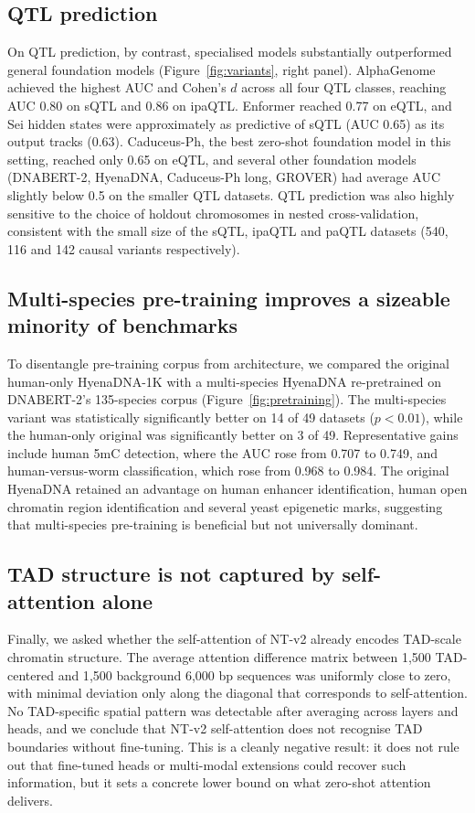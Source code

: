 \documentclass[11pt,a4paper]{article}
\begin{document}
\subsection{QTL prediction}
On QTL prediction, by contrast, specialised models substantially outperformed general foundation models (Figure~\ref{fig:variants}, right panel). AlphaGenome achieved the highest AUC and Cohen's $d$ across all four QTL classes, reaching AUC 0.80 on sQTL and 0.86 on ipaQTL. Enformer reached 0.77 on eQTL, and Sei hidden states were approximately as predictive of sQTL (AUC 0.65) as its output tracks (0.63). Caduceus-Ph, the best zero-shot foundation model in this setting, reached only 0.65 on eQTL, and several other foundation models (DNABERT-2, HyenaDNA, Caduceus-Ph long, GROVER) had average AUC slightly below 0.5 on the smaller QTL datasets. QTL prediction was also highly sensitive to the choice of holdout chromosomes in nested cross-validation, consistent with the small size of the sQTL, ipaQTL and paQTL datasets (540, 116 and 142 causal variants respectively).

\subsection{Multi-species pre-training improves a sizeable minority of benchmarks}
To disentangle pre-training corpus from architecture, we compared the original human-only HyenaDNA-1K with a multi-species HyenaDNA re-pretrained on DNABERT-2's 135-species corpus (Figure~\ref{fig:pretraining}). The multi-species variant was statistically significantly better on 14 of 49 datasets ($p < 0.01$), while the human-only original was significantly better on 3 of 49. Representative gains include human 5mC detection, where the AUC rose from 0.707 to 0.749, and human-versus-worm classification, which rose from 0.968 to 0.984. The original HyenaDNA retained an advantage on human enhancer identification, human open chromatin region identification and several yeast epigenetic marks, suggesting that multi-species pre-training is beneficial but not universally dominant.

\subsection{TAD structure is not captured by self-attention alone}
Finally, we asked whether the self-attention of NT-v2 already encodes TAD-scale chromatin structure. The average attention difference matrix between 1{,}500 TAD-centered and 1{,}500 background 6{,}000 bp sequences was uniformly close to zero, with minimal deviation only along the diagonal that corresponds to self-attention. No TAD-specific spatial pattern was detectable after averaging across layers and heads, and we conclude that NT-v2 self-attention does not recognise TAD boundaries without fine-tuning. This is a cleanly negative result: it does not rule out that fine-tuned heads or multi-modal extensions could recover such information, but it sets a concrete lower bound on what zero-shot attention delivers.
\end{document}
